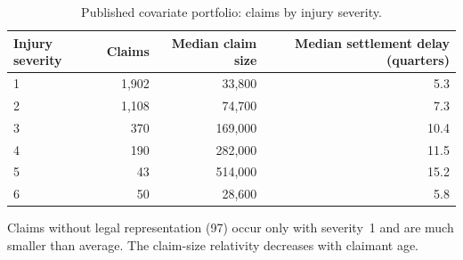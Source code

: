 \documentclass[
    a4paper,
    man,
    floatsintext
]{style}
\begin{document}
\begin{appendices}
\begin{table}[!htbp]
\centering
\small
\caption{Published covariate portfolio: claims by injury severity.}
\label{tab:cov}
\begin{tabular}{@{}lrrr@{}}
\toprule
Injury severity & Claims & Median claim size & Median settlement delay (quarters) \\
\midrule
1 & 1,902 & 33,800 & 5.3 \\
2 & 1,108 & 74,700 & 7.3 \\
3 & 370 & 169,000 & 10.4 \\
4 & 190 & 282,000 & 11.5 \\
5 & 43 & 514,000 & 15.2 \\
6 & 50 & 28,600 & 5.8 \\
\bottomrule
\end{tabular}
\end{table}

Claims without legal representation (97) occur only with severity~1 and are much smaller than average. The claim-size relativity decreases with claimant age.

\end{appendices}
\end{document}

